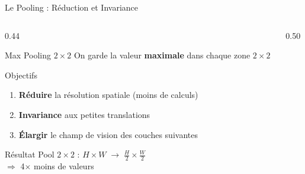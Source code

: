 \documentclass[aspectratio=169, 10pt]{beamer}
\begin{document}
\begin{frame}{Le Pooling : Réduction et Invariance}
  \begin{columns}[T]
    \begin{column}{0.44\textwidth}
      \begin{block}{Max Pooling $2 \times 2$}
        On garde la valeur \textbf{maximale} dans chaque zone $2\times2$
      \end{block}
      \smallskip
      \begin{block}{Objectifs}
        \begin{enumerate}
          \item \textbf{Réduire} la résolution spatiale (moins de calculs)
          \item \textbf{Invariance} aux petites translations
          \item \textbf{Élargir} le champ de vision des couches suivantes
        \end{enumerate}
      \end{block}
      \smallskip
      \begin{exampleblock}{Résultat}
        Pool $2\!\times\!2$ : $H\!\times\!W \;\to\; \frac{H}{2}\!\times\!\frac{W}{2}$\\
        $\Rightarrow$ 4$\times$ moins de valeurs
      \end{exampleblock}
    \end{column}
    \begin{column}{0.50\textwidth}
      \centering
\end{column}
\end{columns}
\end{frame}
\end{document}
